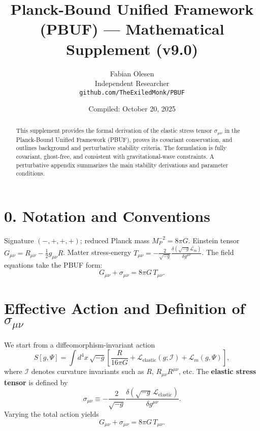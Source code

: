 \documentclass[12pt,a4paper]{article}
\title{\textbf{Planck-Bound Unified Framework (PBUF) — Mathematical Supplement (v9.0)}}
\author{Fabian Olesen\\Independent Researcher\\\texttt{github.com/TheExiledMonk/PBUF}}
\date{Compiled: October 20, 2025}
\begin{document}
\maketitle

\begin{abstract}
This supplement provides the formal derivation of the elastic stress tensor $\sigma_{\mu\nu}$ in the Planck-Bound Unified Framework (PBUF), proves its covariant conservation, and outlines background and perturbative stability criteria. The formulation is fully covariant, ghost-free, and consistent with gravitational-wave constraints. A perturbative appendix summarizes the main stability derivations and parameter conditions.
\end{abstract}

\section*{0. Notation and Conventions}
Signature $(-,+,+,+)$; reduced Planck mass $M_P^{-2}=8\pi G$. Einstein tensor $G_{\mu\nu}=R_{\mu\nu}-\tfrac{1}{2}g_{\mu\nu}R$.  
Matter stress-energy $T_{\mu\nu}=-\frac{2}{\sqrt{-g}}\frac{\delta(\sqrt{-g}\mathcal{L}_m)}{\delta g^{\mu\nu}}$.
The field equations take the PBUF form:
\begin{equation}
G_{\mu\nu} + \sigma_{\mu\nu} = 8\pi G\,T_{\mu\nu}.
\end{equation}

\section{Effective Action and Definition of $\sigma_{\mu\nu}$}
We start from a diffeomorphism-invariant action
\begin{equation}
S[g,\Psi]=\int d^4x\,\sqrt{-g}\left[\frac{R}{16\pi G}+\mathcal{L}_{\mathrm{elastic}}(g;\mathcal{I})+\mathcal{L}_m(g,\Psi)\right],
\end{equation}
where $\mathcal{I}$ denotes curvature invariants such as $R$, $R_{\mu\nu}R^{\mu\nu}$, etc.  
The \textbf{elastic stress tensor} is defined by
\begin{equation}
\sigma_{\mu\nu}\equiv -\frac{2}{\sqrt{-g}}\frac{\delta(\sqrt{-g}\,\mathcal{L}_{\mathrm{elastic}})}{\delta g^{\mu\nu}}.
\end{equation}
Varying the total action yields
\begin{equation}
G_{\mu\nu}+\sigma_{\mu\nu}=8\pi G\,T_{\mu\nu}.
\end{equation}
\end{document}
